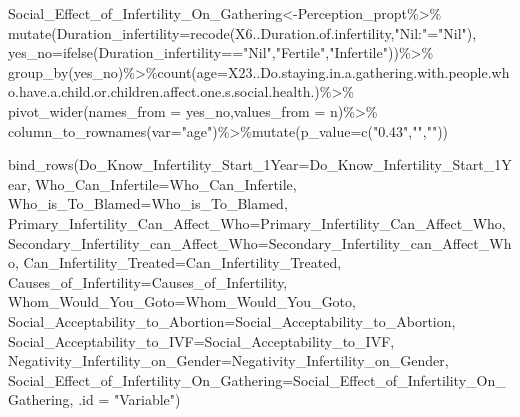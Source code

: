 \documentclass[
]{article}
\newenvironment{Shaded}{\begin{snugshade}}{\end{snugshade}}
\newcommand{\AttributeTok}[1]{\textcolor[rgb]{0.77,0.63,0.00}{#1}}
\newcommand{\FunctionTok}[1]{\textcolor[rgb]{0.00,0.00,0.00}{#1}}
\newcommand{\NormalTok}[1]{#1}
\newcommand{\OtherTok}[1]{\textcolor[rgb]{0.56,0.35,0.01}{#1}}
\newcommand{\SpecialCharTok}[1]{\textcolor[rgb]{0.00,0.00,0.00}{#1}}
\newcommand{\StringTok}[1]{\textcolor[rgb]{0.31,0.60,0.02}{#1}}
\begin{document}
\begin{Shaded}
\begin{Highlighting}[]
\NormalTok{Social\_Effect\_of\_Infertility\_On\_Gathering}\OtherTok{\textless{}{-}}\NormalTok{Perception\_propt}\SpecialCharTok{\%\textgreater{}\%}
  \FunctionTok{mutate}\NormalTok{(}\AttributeTok{Duration\_infertility=}\FunctionTok{recode}\NormalTok{(X6..Duration.of.infertility,}\StringTok{"Nil:"}\OtherTok{=}\StringTok{"Nil"}\NormalTok{),}
         \AttributeTok{yes\_no=}\FunctionTok{ifelse}\NormalTok{(Duration\_infertility}\SpecialCharTok{==}\StringTok{"Nil"}\NormalTok{,}\StringTok{"Fertile"}\NormalTok{,}\StringTok{"Infertile"}\NormalTok{))}\SpecialCharTok{\%\textgreater{}\%}
  \FunctionTok{group\_by}\NormalTok{(yes\_no)}\SpecialCharTok{\%\textgreater{}\%}\FunctionTok{count}\NormalTok{(}\AttributeTok{age=}\NormalTok{X23..Do.staying.in.a.gathering.with.people.who.have.a.child.or.children.affect.one.s.social.health.)}\SpecialCharTok{\%\textgreater{}\%}
  \FunctionTok{pivot\_wider}\NormalTok{(}\AttributeTok{names\_from =}\NormalTok{ yes\_no,}\AttributeTok{values\_from =}\NormalTok{ n)}\SpecialCharTok{\%\textgreater{}\%}
  \FunctionTok{column\_to\_rownames}\NormalTok{(}\AttributeTok{var=}\StringTok{"age"}\NormalTok{)}\SpecialCharTok{\%\textgreater{}\%}\FunctionTok{mutate}\NormalTok{(}\AttributeTok{p\_value=}\FunctionTok{c}\NormalTok{(}\StringTok{"0.43"}\NormalTok{,}\StringTok{""}\NormalTok{,}\StringTok{""}\NormalTok{))}

\FunctionTok{bind\_rows}\NormalTok{(}\AttributeTok{Do\_Know\_Infertility\_Start\_1Year=}\NormalTok{Do\_Know\_Infertility\_Start\_1Year,}
          \AttributeTok{Who\_Can\_Infertile=}\NormalTok{Who\_Can\_Infertile,}
          \AttributeTok{Who\_is\_To\_Blamed=}\NormalTok{Who\_is\_To\_Blamed,}
          \AttributeTok{Primary\_Infertility\_Can\_Affect\_Who=}\NormalTok{Primary\_Infertility\_Can\_Affect\_Who,}
          \AttributeTok{Secondary\_Infertility\_can\_Affect\_Who=}\NormalTok{Secondary\_Infertility\_can\_Affect\_Who,}
          \AttributeTok{Can\_Infertility\_Treated=}\NormalTok{Can\_Infertility\_Treated,}
          \AttributeTok{Causes\_of\_Infertility=}\NormalTok{Causes\_of\_Infertility,}
          \AttributeTok{Whom\_Would\_You\_Goto=}\NormalTok{Whom\_Would\_You\_Goto,}
          \AttributeTok{Social\_Acceptability\_to\_Abortion=}\NormalTok{Social\_Acceptability\_to\_Abortion,}
          \AttributeTok{Social\_Acceptability\_to\_IVF=}\NormalTok{Social\_Acceptability\_to\_IVF,}
          \AttributeTok{Negativity\_Infertility\_on\_Gender=}\NormalTok{Negativity\_Infertility\_on\_Gender,}
          \AttributeTok{Social\_Effect\_of\_Infertility\_On\_Gathering=}\NormalTok{Social\_Effect\_of\_Infertility\_On\_Gathering,}
          \AttributeTok{.id =} \StringTok{"Variable"}\NormalTok{)}
\end{Highlighting}
\end{Shaded}
\end{document}
